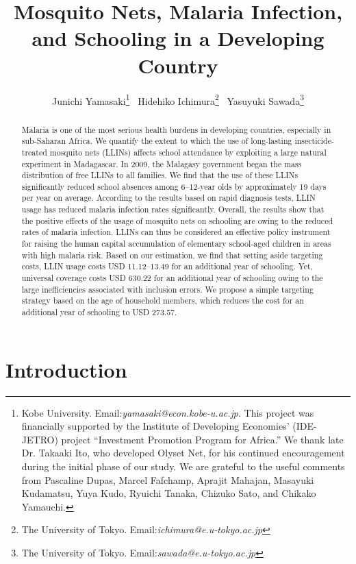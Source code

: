 \documentclass[fleqn,11pt]{article}
\begin{document}
\title{Mosquito Nets, Malaria Infection, and Schooling in a Developing Country}
\author{Junichi Yamasaki\thanks{%
Kobe University. Email:\textit{yamasaki@econ.kobe-u.ac.jp}. This project was financially supported by the Institute of Developing Economies' (IDE-JETRO) project ``Investment Promotion Program for Africa.'' We thank late Dr. Takaaki Ito, who developed Olyset Net, for his continued encouragement during the initial phase of our study.  We are grateful to the useful comments from Pascaline Dupas, Marcel Fafchamp, Aprajit Mahajan, Masayuki Kudamatsu, Yuya Kudo, Ryuichi Tanaka, Chizuko Sato, and Chikako Yamauchi.} \ Hidehiko Ichimura\thanks{%
The University of Tokyo. Email:\textit{ichimura@e.u-tokyo.ac.jp}} \ Yasuyuki Sawada\thanks{%
The University of Tokyo. Email:\textit{sawada@e.u-tokyo.ac.jp}} }
\maketitle

\begin{abstract}
Malaria is one of the most serious health burdens in developing countries,
especially in sub-Saharan Africa. We quantify the extent to which the use of long-lasting insecticide-treated mosquito nets (LLINs) affects school attendance by exploiting a large natural experiment in Madagascar. In 2009, the Malagasy government began the mass distribution of free LLINs to all families. We find that the use of these LLINs significantly reduced school absences among 6--12-year olds by approximately 19 days per year on average. According to the results based on rapid diagnosis tests, LLIN usage has reduced malaria infection rates significantly.
Overall, the results show that the positive effects of the usage of mosquito nets on schooling are owing to the reduced rates of malaria infection. 
LLINs can thus be considered an effective policy instrument for raising the human capital accumulation of elementary school-aged children in areas with high malaria risk. Based on our estimation, we find that setting aside targeting costs, LLIN usage costs USD 11.12--13.49 for an additional year of schooling. Yet, universal coverage costs USD 630.22 for an additional year of schooling  owing to the large inefficiencies associated with inclusion errors. We propose a simple targeting strategy based on the age of household members, which reduces the cost for an additional year of schooling to USD 273.57.
\end{abstract}

\section{Introduction}
\end{document}
